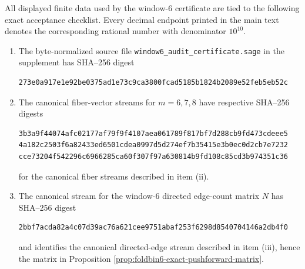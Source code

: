 \begin{proposition}\label{prop:window6-audit-output-wrapper}
All displayed finite data used by the window-\(6\) certificate are tied to the following exact acceptance checklist.  Every decimal endpoint printed in the main text denotes the corresponding rational number with denominator \(10^{10}\).
\begin{enumerate}[label=\textup{(\alph*)}]
\item The byte-normalized source file \texttt{window6\_audit\_certificate.sage} in the supplement has SHA--256 digest
\begin{center}
\begin{minipage}{0.92\linewidth}
\begin{Verbatim}[breaklines=true,breakanywhere=true,fontsize=\scriptsize]
273e0a917e1e92be0375ad1e73c9ca3800fcad5185b1824b2089e52feb5eb52c
\end{Verbatim}
\end{minipage}
\end{center}
\item The canonical fiber-vector streams for \(m=6,7,8\) have respective SHA--256 digests
\begin{center}
\begin{minipage}{0.92\linewidth}
\begin{Verbatim}[breaklines=true,breakanywhere=true,fontsize=\scriptsize]
3b3a9f44074afc02177af79f9f4107aea061789f817bf7d288cb9fd473cdeee5
4a182c2503f6a82433ed6501cdea0997d5d274ef7b35415e3b0ec0d2cb7e7232
cce73204f542296c6966285ca60f307f97a630814b9fd108c85cd3b974351c36
\end{Verbatim}
\end{minipage}
\end{center}
for the canonical fiber streams described in item \textup{(ii)}.
\item The canonical stream for the window-\(6\) directed edge-count matrix \(N\) has SHA--256 digest
\begin{center}
\begin{minipage}{0.92\linewidth}
\begin{Verbatim}[breaklines=true,breakanywhere=true,fontsize=\scriptsize]
2bbf7acda82a4c07d39ac76a621cee9751abaf253f6298d8540704146a2db4f0
\end{Verbatim}
\end{minipage}
\end{center}
and identifies the canonical directed-edge stream described in item \textup{(iii)}, hence the matrix in Proposition \ref{prop:foldbin6-exact-pushforward-matrix}.

\end{enumerate}
\end{proposition}
